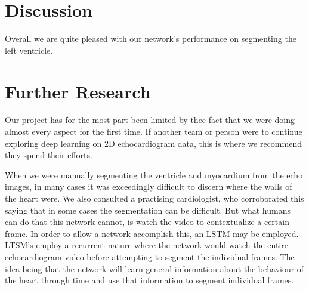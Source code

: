 \documentclass[12pt]{article}
\begin{document}

\section{Discussion}
Overall we are quite pleased with our network's performance on segmenting the left ventricle.


\section{Further Research}
Our project has for the most part been limited by thee fact that we were doing almost every aspect for the first time.
If another team or person were to continue exploring deep learning on 2D echocardiogram data, this is where we recommend they spend their efforts.

When we were manually segmenting the ventricle and myocardium from the echo images, in many cases it was exceedingly difficult to discern where the walls of the heart were.
We also consulted a practising cardiologist, who corroborated this saying that in some cases the segmentation can be difficult.
But what humans  can do that this network cannot, is watch the video to contextualize a certain frame.
In order to allow a network accomplish this, an LSTM may be employed.
LTSM's employ a recurrent nature where the network would watch the entire echocardiogram video before attempting to segment the individual frames.
The idea being that the network will learn general information about the behaviour of the heart through time and use that information to segment individual frames.
\end{document}

